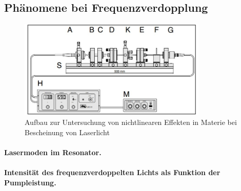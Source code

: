 \documentclass[../main.tex]{subfiles}
\begin{document}
    \subsection{Phänomene bei Frequenzverdopplung}
        \begin{figure}[H]
            \centering
            \includegraphics[width=0.8\textwidth]{Bilddateien/Versuchsaufbau/Teil7.jpg}
            \caption{Aufbau zur Untersuchung von nichtlinearen Effekten in Materie bei Bescheinung von Laserlicht}
            \label{fig:Aufbau:Teil7}
        \end{figure}    
        
        \paragraph{Lasermoden im Resonator.}
        
        \paragraph{Intensität des frequenzverdoppelten Lichts als Funktion der Pumpleistung.}
\end{document}

